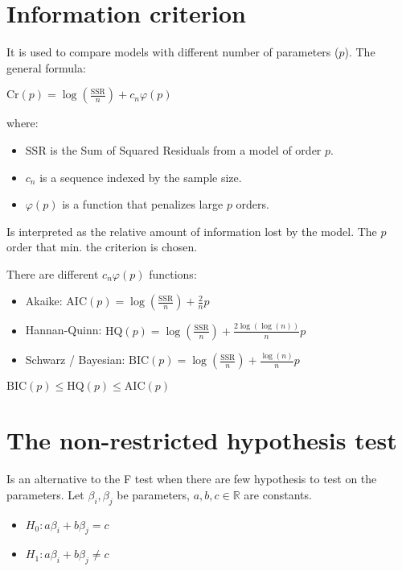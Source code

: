 \documentclass[10pt, a4paper, landscape]{article}
\newcommand{\SSR}{\mathrm{SSR}}
\begin{document}
\begin{multicols}{3}
		\columnbreak
		
		\section*{Information criterion}
		
		It is used to compare models with different number of parameters ($p$). The general formula:
		
		\begin{center}
			$\mathrm{Cr}(p) = \log(\frac{\SSR}{n}) + c_{n} \varphi (p)$
		\end{center}
		
		where:
		
		\begin{itemize}[leftmargin=*]
			\item $\SSR$ is the Sum of Squared Residuals from a model of order $p$.
			\item $c_{n}$ is a sequence indexed by the sample size.
			\item $\varphi(p)$ is a function that penalizes large $p$ orders.
		\end{itemize}
		
		Is interpreted as the relative amount of information lost by the model. The $p$ order that min. the criterion is chosen.
		
		There are different $c_{n} \varphi(p)$ functions:
		
		\begin{itemize}[leftmargin=*]
			\item Akaike: $\mathrm{AIC}(p) = \log(\frac{\SSR}{n}) + \frac{2}{n}p$
			\item Hannan-Quinn: $\mathrm{HQ}(p) = \log(\frac{\SSR}{n}) + \frac{2 \log(\log(n))}{n}p$
			\item Schwarz / Bayesian: $\mathrm{BIC}(p) = \log(\frac{\SSR}{n}) + \frac{\log(n)}{n}p$
		\end{itemize}
		
		$\mathrm{BIC}(p) \leq \mathrm{HQ}(p) \leq \mathrm{AIC}(p)$
		
		\section*{The non-restricted hypothesis test}
		
		Is an alternative to the F test when there are few hypothesis to test on the parameters. Let $\beta_{i}, \beta_{j}$ be parameters, $a, b, c \in \mathbb{R}$ are constants.
		
		\begin{itemize}[leftmargin=*]
			\item $H_{0}: a \beta_{i} + b \beta_{j} = c$
			\item $H_{1}: a \beta_{i} + b \beta_{j} \neq c$
		\end{itemize}
		

\end{multicols}
\end{document}
